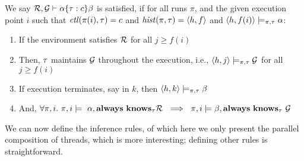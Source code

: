 \begin{proposition}
We say $\mathcal{R},\mathcal{G} \vdash \alpha \{\tau:c\}\beta$ is satisfied, if for all runs $\pi$, and the given execution point $i$ such that $\mathit{ctl}(\pi(i),\tau) = c$ and $\mathit{hist}(\pi,\tau) = \langle h,f\rangle$ and
$\langle h,f(i) \rangle \models_{\pi,\tau} \alpha$:
\begin{enumerate}
    \item If the environment satisfies $\mathcal{R}$ for all $j\geq f(i)$
    \item Then, $\tau$ maintains $\mathcal{G}$ throughout the execution, i.e., $\langle h,j \rangle \models_{\pi,\tau} \mathcal{G}$ for all $j\geq f(i)$
    \item If execution terminates, say in $k$, then  $\langle h,k \rangle \models_{\pi,\tau} \beta$
    \item And, $\forall \pi, i.\ \pi,i\models\ \alpha, \Always\ \Knows_{\tid}\rely\ \implies\ \pi,i\models\beta,\Always\ \Knows_{\tid}\ \guarantee$
\end{enumerate}
\end{proposition}




We can now define the inference rules, of which here we only present the parallel composition of threads, which is more interesting; defining other rules is straightforward.
%



